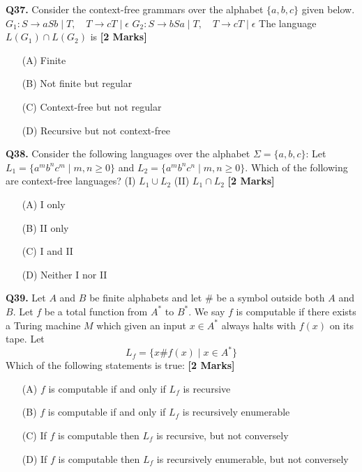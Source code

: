\documentclass[11pt]{article}
\newcommand{\questionb}[2]{
    \noindent\textbf{Q#2.} #1 \hfill \textbf{[2 Marks]}
}
\begin{document}
\questionb{Consider the context-free grammars over the alphabet \( \{a, b, c\} \) given below.  
\( G_1: S \rightarrow aS b \mid T, \quad T \rightarrow cT \mid \epsilon \)  
\( G_2: S \rightarrow bS a \mid T, \quad T \rightarrow cT \mid \epsilon \)  
The language \( L(G_1) \cap L(G_2) \) is}{37}
\begin{enumerate}
    \item[(A)] Finite  
    \item[(B)] Not finite but regular  
    \item[(C)] Context-free but not regular  
    \item[(D)] Recursive but not context-free  
\end{enumerate}
\vspace{0.5cm}

\questionb{Consider the following languages over the alphabet \( \Sigma = \{a, b, c\} \):  
Let \( L_1 = \{a^m b^n c^m \mid m, n \geq 0\} \) and \( L_2 = \{a^m b^n c^n \mid m, n \geq 0\} \).  
Which of the following are context-free languages?  
(I) \( L_1 \cup L_2 \)  
(II) \( L_1 \cap L_2 \) }{38}
\begin{enumerate}
    \item[(A)] I only  
    \item[(B)] II only  
    \item[(C)] I and II  
    \item[(D)] Neither I nor II  
\end{enumerate}
\vspace{0.5cm}

\questionb{Let \( A \) and \( B \) be finite alphabets and let \( \# \) be a symbol outside both \( A \) and \( B \).  
Let \( f \) be a total function from \( A^* \) to \( B^* \). We say \( f \) is computable if there exists a Turing machine \( M \)  
which given an input \( x \in A^* \) always halts with \( f(x) \) on its tape. Let  
\[
L_f = \{x \# f(x) \mid x \in A^* \}
\]  
Which of the following statements is true:}{39}
\begin{enumerate}
    \item[(A)] \( f \) is computable if and only if \( L_f \) is recursive  
    \item[(B)] \( f \) is computable if and only if \( L_f \) is recursively enumerable  
    \item[(C)] If \( f \) is computable then \( L_f \) is recursive, but not conversely  
    \item[(D)] If \( f \) is computable then \( L_f \) is recursively enumerable, but not conversely  
\end{enumerate}
\vspace{0.5cm}
\end{document}
